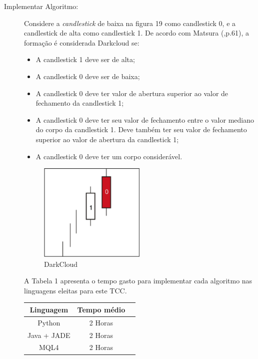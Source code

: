 \begin{description}
\item [Implementar Algoritmo:]
Considere a \textit{candlestick} de baixa na figura 19 como candlestick 0, e a candlestick de alta como candlestick 1. De acordo com Matsura (\citeyear{matsura2006},p.61), a formação é considerada Darkcloud se:

\begin{itemize}
  \item A candlestick 1 deve ser de alta;
  \item A candlestick 0 deve ser de baixa;
  \item A candlestick 0 deve ter valor de abertura superior ao valor de fechamento da candlestick 1;
  \item A candlestick 0 deve ter seu valor de fechamento entre o valor mediano do corpo da candlestick 1. Deve também ter seu valor de fechamento superior ao valor de abertura da candlestick 1;
  \item A candlestick 0 deve ter um corpo considerável.
\end{itemize}

\begin{figure}[h!]
\centering
\label{f15}
\includegraphics[width=0.5\textwidth]{figuras/f12}
\caption{DarkCloud}
\end{figure}

A Tabela 1  apresenta o tempo gasto para implementar cada algoritmo nas linguagens eleitas para este TCC.

\begin{table}[h!]
	\centering
	\label{t01}
	
	\begin{tabular}{ccc}
		\toprule
		\textbf{Linguagem} & \textbf{Tempo médio}\\
		\midrule
		Python & 2 Horas  \\
		Java + JADE & 2 Horas  \\
		MQL4 & 2 Horas  \\
		\bottomrule
	\end{tabular}


\end{table}
\end{description}
